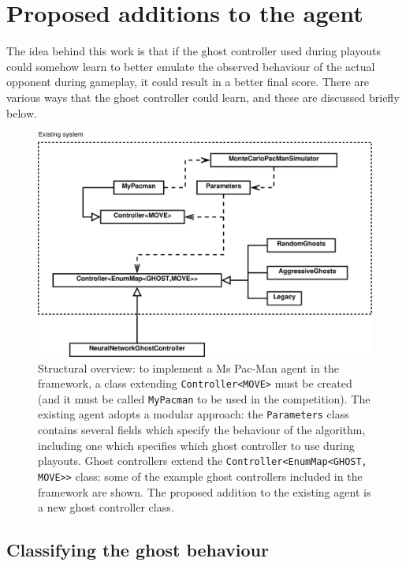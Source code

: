 \section{Proposed additions to the agent}

The idea behind this work is that if the ghost controller used during playouts could somehow learn to better emulate the observed behaviour of the actual opponent during gameplay, it could result in a better final score.  There are various ways that the ghost controller could learn, and these are discussed briefly below.

\begin{figure}
\includegraphics[width=\linewidth]{diagrams/proposed}
\caption[Structural overview]{Structural overview: to implement a Ms Pac-Man agent in the framework, a class extending {\tt Controller<MOVE>} must be created (and it must be called {\tt MyPacman} to be used in the competition).  The existing agent adopts a modular approach: the {\tt Parameters} class contains several fields which specify the behaviour of the algorithm, including one which specifies which ghost controller to use during playouts.  Ghost controllers extend the {\tt Controller<EnumMap<GHOST, MOVE>>} class: some of the example ghost controllers included in the framework are shown.  The proposed addition to the existing agent is a new ghost controller class.}
\label{fig:proposed}
\end{figure}

\subsection{Classifying the ghost behaviour}

